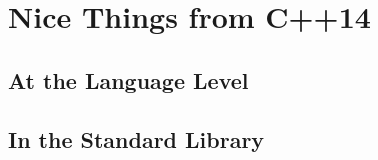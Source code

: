 \chapter{Nice Things from C++14}

\section{At the Language Level}

\section{In the Standard Library}
